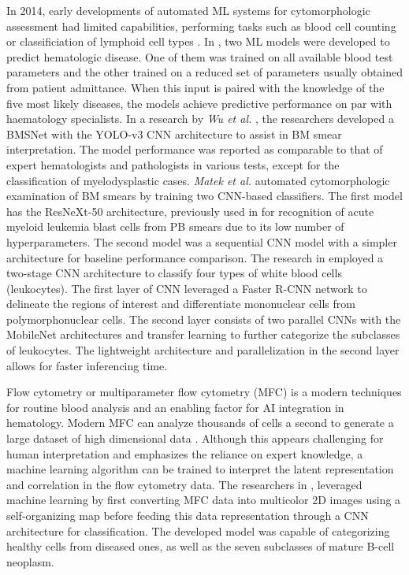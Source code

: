\documentclass[a4paper]{article}
\begin{document}
In 2014, early developments of automated ML systems for cytomorphologic assessment had limited capabilities, performing tasks such as blood cell counting or classificiation of lymphoid cell types \cite{alomari_automatic_2014,alferez_automatic_2014,alferez_automatic_2015}.
In \cite{guncar_application_2018}, two ML models were developed to predict hematologic disease.
One of them was trained on all available blood test parameters and the other trained on a reduced set of parameters usually obtained from patient admittance.
When this input is paired with the knowledge of the five most likely diseases, the models achieve predictive performance on par with haematology specialists.
In a research by \textit{Wu et al.} \cite{wu_hematologist-level_2020}, the researchers developed a BMSNet with the YOLO-v3 CNN architecture to assist in BM smear interpretation.
The model performance was reported as comparable to that of expert hematologists and pathologists in various tests, except for the classification of myelodysplastic cases.
\textit{Matek et al.} \cite{matek_highly_2021} automated cytomorphologic examination of BM smears by training two CNN-based classifiers. 
The first model has the ResNeXt-50 architecture, previously used in \cite{matek_human-level_2019} for recognition of acute myeloid leukemia blast cells from PB smears due to its low number of hyperparameters.
The second model was a sequential CNN model with a simpler architecture for baseline performance comparison.
The research in \cite{cheuque_efficient_2022} employed a two-stage CNN architecture to classify four types of white blood cells (leukocytes).
The first layer of CNN leveraged a Faster R-CNN network to delineate the regions of interest and differentiate mononuclear cells from polymorphonuclear cells. 
The second layer consists of two parallel CNNs with the MobileNet architectures and transfer learning to further categorize the subclasses of leukocytes. 
The lightweight architecture and parallelization in the second layer allows for faster inferencing time.

Flow cytometry or multiparameter flow cytometry (MFC) is a modern techniques for routine blood analysis and an enabling factor for AI integration in hematology.
Modern MFC can analyze thousands of cells a second to generate a large dataset of high dimensional data \cite{walter_artificial_2023}. 
Although this appears challenging for human interpretation and emphasizes the reliance on expert knowledge, a machine learning algorithm can be trained to interpret the latent representation and correlation in the flow cytometry data.
The researchers in \cite{zhao_hematologist-level_2020}, leveraged machine learning by first converting MFC data into multicolor 2D images using a self-organizing map before feeding this data representation through a CNN architecture for classification.
The developed model was capable of categorizing healthy cells from diseased ones, as well as the seven subclasses of mature B-cell neoplasm.
\end{document}
